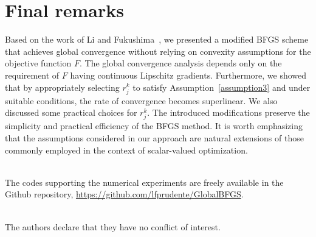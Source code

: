 \documentclass[11pt]{article}
\numberwithin{assumption}{section}
\newcommand{\myscale}{0.45}
\begin{document}

\section{Final remarks} \label{sec:final}

 Based on the work of Li and Fukushima~\cite{Li-Fu-MBFGS}, we presented a modified BFGS scheme that achieves global convergence without relying on convexity assumptions for the objective function $F$. The global convergence analysis depends only on the requirement of $F$ having continuous Lipschitz gradients. Furthermore, we showed that by appropriately selecting $r_j^k$ to satisfy Assumption~\ref{assumption3} and under suitable conditions, the rate of convergence becomes superlinear. We also discussed some practical choices for $r_j^k$. The introduced modifications preserve the simplicity and practical efficiency of the BFGS method. It is worth emphasizing that the assumptions considered in our approach are natural extensions of those commonly employed in the context of scalar-valued optimization.
 
 
 
 \vspace{12pt}
\\
The codes supporting the numerical experiments are freely available in the Github repository, \url{https://github.com/lfprudente/GlobalBFGS}.

 \vspace{12pt}
\\
The authors declare that they have no conflict of interest.
 


\end{document}
